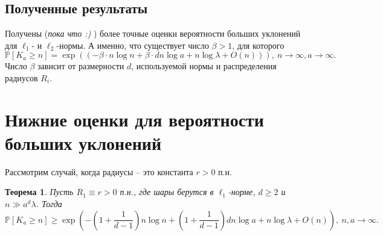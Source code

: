 \documentclass[12pt]{article}
\theoremstyle{plain}
\newtheorem{thm}{Теорема} %
\theoremstyle{definition}
\theoremstyle{remark}
\def\geq{\geqslant}
\newcommand{\cuplim}{\bigcup\limits}
\newcommand{\R}{\mathbb{R}}
\newcommand{\PP}{\mathbb{P}}
\newcommand{\til}{\widetilde}
\begin{document}
\subsection{Полученные результаты}
Получены ({\it пока что :)} ) более точные оценки вероятности больших уклонений для $\ell_1$- и $\ell_2$-нормы. А именно, что существует число $\beta >1$, для которого $$\PP[K_a \geq n] = \exp((-\beta\cdot n\log n + \beta\cdot dn\log a + n\log\lambda + O(n))), \ n\to \infty, a \to\infty.$$
Число $\beta$ зависит от размерности $d$, используемой нормы и распределения радиусов $R_i$.



%
%
%

\section{Нижние оценки для вероятности больших уклонений}

Рассмотрим случай, когда радиусы -- это константа $r>0$ п.н. 

\begin{thm}
Пусть $R_1\equiv r > 0$ п.н., где шары берутся в $\ell_1$-норме, $d\geq 2$ и $n \gg a^d\lambda$. 
Тогда $$\PP[K_a \geq n] \geq \exp \left(-\left(1+\dfrac{1}{d-1}\right)n\log n + \left(1+\dfrac{1}{d-1}\right)dn\log a  + n\log\lambda + O(n)\right),\  n, a\to \infty.$$
\end{thm}{}
\end{document}
